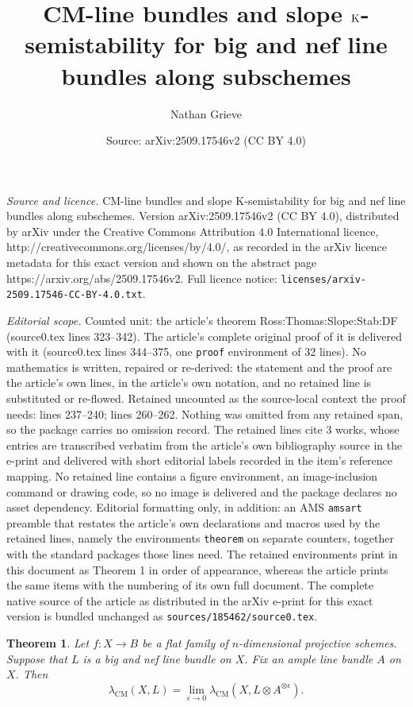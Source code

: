 \documentclass[10pt,a4paper]{amsart}
\title{\uppercase{CM}-line bundles and slope $\K$-semistability for big and nef line bundles along subschemes}
\author{Nathan Grieve}
\date{Source: arXiv:2509.17546v2 (CC BY 4.0)}
\newtheorem{theorem}{Theorem}
\newcommand{\K}{\mathrm{K}}
\begin{document}
\maketitle

\noindent\emph{Source and licence.} \uppercase{CM}-line bundles and slope $\K$-semistability for big and nef line bundles along subschemes. Version arXiv:2509.17546v2 (CC BY 4.0), distributed by arXiv under the Creative Commons Attribution 4.0 International licence, http://creativecommons.org/licenses/by/4.0/, as recorded in the arXiv licence metadata for this exact version and shown on the abstract page https://arxiv.org/abs/2509.17546v2. Full licence notice: \texttt{licenses/arxiv-2509.17546-CC-BY-4.0.txt}.\par\smallskip

\noindent\textit{Editorial scope.} Counted unit: the article's theorem Ross:Thomas:Slope:Stab:DF (source0.tex lines 323--342). The article's complete original proof of it is delivered with it (source0.tex lines 344--375, one \texttt{proof} environment of 32 lines). No mathematics is written, repaired or re-derived: the statement and the proof are the article's own lines, in the article's own notation, and no retained line is substituted or re-flowed.  Retained uncounted as the source-local context the proof needs: lines 237--240; lines 260--262.  Nothing was omitted from any retained span, so the package carries no omission record.  The retained lines cite 3 works, whose entries are transcribed verbatim from the article's own bibliography source in the e-print and delivered with short editorial labels recorded in the item's reference mapping.  No retained line contains a figure environment, an image-inclusion command or drawing code, so no image is delivered and the package declares no asset dependency.  Editorial formatting only, in addition: an AMS \texttt{amsart} preamble that restates the article's own declarations and macros used by the retained lines, namely the environments \texttt{theorem} on separate counters, together with the standard packages those lines need.  The retained environments print in this document as Theorem 1 in order of appearance, whereas the article prints the same items with the numbering of its own full document.  The complete native source of the article as distributed in the arXiv e-print for this exact version is bundled unchanged as \texttt{sources/185462/source0.tex}.
\begin{theorem}\label{CM:line:bundle:epsilon:zero}
Let $f \colon X \rightarrow B$ be a flat family of $n$-dimensional projective schemes.  Suppose that $L$ is a big and nef line bundle on $X$.  Fix an ample line bundle $A$ on $X$.  Then
$$\lambda_{\mathrm{CM}}(X,L) = \lim\limits_{\epsilon \to 0} \lambda_{\mathrm{CM}}(X,L \otimes A^{\otimes \epsilon})  \text{.} $$
\end{theorem}
\end{document}
